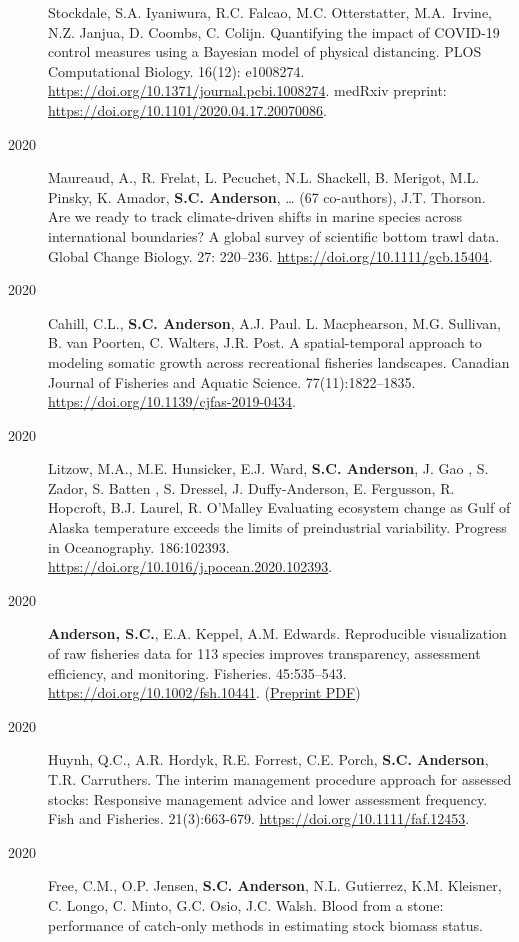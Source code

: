 \begin{description}
Stockdale, S.A. Iyaniwura, R.C. Falcao, M.C. Otterstatter, M.A.\ Irvine,
N.Z. Janjua, D. Coombs, C. Colijn. Quantifying the impact of COVID-19
control measures using a Bayesian model of physical distancing. PLOS
Computational Biology. 16(12): e1008274.
\url{https://doi.org/10.1371/journal.pcbi.1008274}. medRxiv preprint:
\url{https://doi.org/10.1101/2020.04.17.20070086}.
\item[2020]
Maureaud, A., R. Frelat, L. Pecuchet, N.L. Shackell, B. Merigot, M.L.
Pinsky, K. Amador, \textbf{S.C. Anderson}, \ldots{} (67 co-authors),
J.T. Thorson. Are we ready to track climate-driven shifts in marine
species across international boundaries? A global survey of scientific
bottom trawl data. Global Change Biology. 27: 220--236.
\url{https://doi.org/10.1111/gcb.15404}.
\item[2020]
Cahill, C.L., \textbf{S.C. Anderson}, A.J. Paul. L. Macphearson, M.G.
Sullivan, B. van Poorten, C. Walters, J.R. Post. A spatial-temporal
approach to modeling somatic growth across recreational fisheries
landscapes. Canadian Journal of Fisheries and Aquatic Science.
77(11):1822--1835. \url{https://doi.org/10.1139/cjfas-2019-0434}.
\item[2020]
Litzow, M.A., M.E. Hunsicker, E.J. Ward, \textbf{S.C. Anderson}, J. Gao
, S. Zador, S. Batten , S. Dressel, J. Duffy-Anderson, E. Fergusson, R.
Hopcroft, B.J. Laurel, R. O'Malley Evaluating ecosystem change as Gulf
of Alaska temperature exceeds the limits of preindustrial variability.
Progress in Oceanography. 186:102393.
\url{https://doi.org/10.1016/j.pocean.2020.102393}.
\item[2020]
\textbf{Anderson, S.C.}, E.A. Keppel, A.M. Edwards. Reproducible
visualization of raw fisheries data for 113 species improves
transparency, assessment efficiency, and monitoring. Fisheries.
45:535--543. \url{https://doi.org/10.1002/fsh.10441}.
(\href{https://www.dropbox.com/s/4mmnomvmpg0dbky/Anderson_etal_2020_reproducible_visualization_preprint.pdf?dl=1}{Preprint
PDF})
\item[2020]
Huynh, Q.C., A.R. Hordyk, R.E. Forrest, C.E. Porch, \textbf{S.C.
Anderson}, T.R. Carruthers. The interim management procedure approach
for assessed stocks: Responsive management advice and lower assessment
frequency. Fish and Fisheries. 21(3):663-679.
\url{https://doi.org/10.1111/faf.12453}.
\item[2020]
Free, C.M., O.P. Jensen, \textbf{S.C. Anderson}, N.L. Gutierrez, K.M.
Kleisner, C. Longo, C. Minto, G.C. Osio, J.C. Walsh. Blood from a stone:
performance of catch-only methods in estimating stock biomass status.

\end{description}
